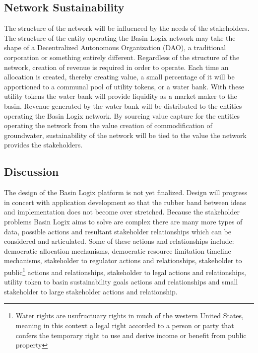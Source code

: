 \documentclass{tufte-handout}
\begin{document}
\subsection{Network Sustainability}\label{sec:headings}

 The structure of the network will be influenced by the needs of the stakeholders. The structure of the entity operating the Basin Logix network may take the shape of a Decentralized Autonomous Organization (DAO), a traditional corporation or something entirely different. Regardless of the structure of the network, creation of revenue is required in order to operate. Each time an allocation is created, thereby creating value, a small percentage of it will be apportioned to a communal pool of utility tokens, or a water bank. With these utility tokens the water bank will provide liquidity as a market maker to the basin. Revenue generated by the water bank will be distributed to the entities operating the Basin Logix network. By sourcing value capture for the entities operating the network from the value creation of commodification of groundwater, sustainability of the network will be tied to the value the network provides the stakeholders. 

\subsection{Discussion}\label{sec:headings}

The design of the Basin Logix platform is not yet finalized. Design will progress in concert with application development so that the rubber band between ideas and implementation does not become over stretched. Because the stakeholder problems Basin Logix aims to solve are complex there are many more types of data, possible actions and resultant stakeholder relationships which can be considered and articulated. Some of these actions and relationships include: democratic allocation mechanisms, democratic resource limitation timeline mechanisms, stakeholder to regulator actions and relationships, stakeholder to public\footnote{Water rights are usufructuary rights in much of the western United States, meaning in this context a legal right accorded to a person or party that confers the temporary right to use and derive income or benefit from public property} actions and relationships, stakeholder to legal actions and relationships, utility token to basin sustainability goals actions and relationships and small stakeholder to large stakeholder actions and relationship. 



\end{document}
